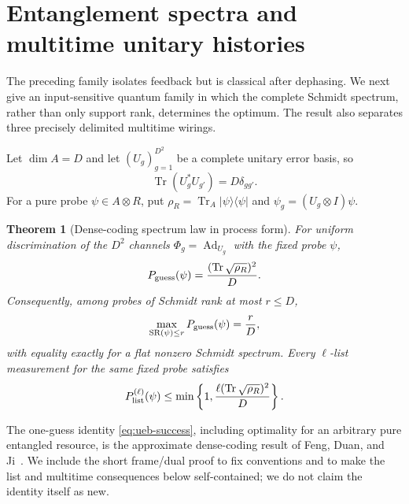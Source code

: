 \documentclass[11pt]{article}
\newtheorem{theorem}{Theorem}[section]
\theoremstyle{definition}
\theoremstyle{remark}
\newcommand{\Tr}{\operatorname{Tr}}
\newcommand{\ket}[1]{\lvert #1\rangle}
\newcommand{\bra}[1]{\langle #1\rvert}
\begin{document}
\section{Entanglement spectra and multitime unitary histories}
\label{sec:ueb}

The preceding family isolates feedback but is classical after dephasing.  We
next give an input-sensitive quantum family in which the complete Schmidt
spectrum, rather than only support rank, determines the optimum.  The result
also separates three precisely delimited multitime wirings.

Let $\dim A=D$ and let $(U_g)_{g=1}^{D^2}$ be a complete unitary error basis,
so
\begin{equation}\label{eq:ueb}
 \Tr(U_g^*U_{g'})=D\delta_{gg'}.
\end{equation}
For a pure probe $\psi\in A\otimes R$, put
$\rho_R=\Tr_A\ket{\psi}\!\bra{\psi}$ and
$\psi_g=(U_g\otimes I)\psi$.

\begin{theorem}[Dense-coding spectrum law in process form]
\label{thm:ueb-spectrum}
For uniform discrimination of the $D^2$ channels
$\Phi_g=\operatorname{Ad}_{U_g}$ with the fixed probe $\psi$,
\begin{equation}\label{eq:ueb-success}
 P_{\rm guess}(\psi)=\frac{(\Tr\sqrt{\rho_R})^2}{D}.
\end{equation}
Consequently, among probes of Schmidt rank at most $r\leq D$,
\begin{equation}\label{eq:schmidt-rank-cap}
 \max_{\operatorname{SR}(\psi)\leq r}P_{\rm guess}(\psi)=\frac rD,
\end{equation}
with equality exactly for a flat nonzero Schmidt spectrum.  Every
$\ell$-list measurement for the same fixed probe satisfies
\begin{equation}\label{eq:ueb-list-cap}
 P_{\rm list}^{(\ell)}(\psi)\leq
 \min\left\{1,\frac{\ell(\Tr\sqrt{\rho_R})^2}{D}\right\}.
\end{equation}
\end{theorem}

The one-guess identity \eqref{eq:ueb-success}, including optimality for an
arbitrary pure entangled resource, is the approximate dense-coding result of
Feng, Duan, and Ji~\cite{feng2006}.  We include the short frame/dual proof to
fix conventions and to make the list and multitime consequences below
self-contained; we do not claim the identity itself as new.
\end{document}
